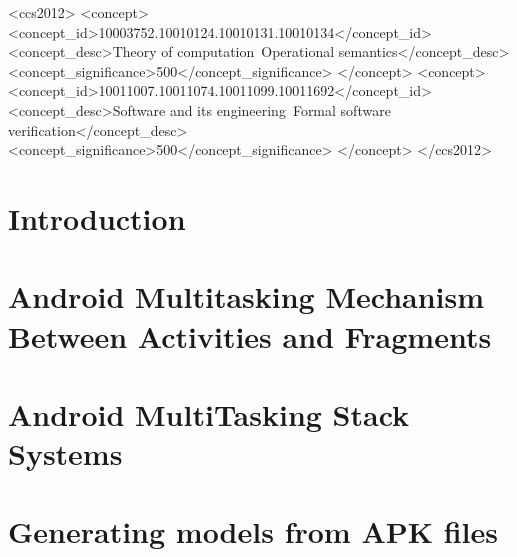 \documentclass[acmsmall,manuscript,screen,review]{acmart}
\begin{document}
\begin{CCSXML}
<ccs2012>
<concept>
<concept_id>10003752.10010124.10010131.10010134</concept_id>
<concept_desc>Theory of computation~Operational semantics</concept_desc>
<concept_significance>500</concept_significance>
</concept>
<concept>
<concept_id>10011007.10011074.10011099.10011692</concept_id>
<concept_desc>Software and its engineering~Formal software verification</concept_desc>
<concept_significance>500</concept_significance>
</concept>
</ccs2012>
\end{CCSXML}

 

 
\maketitle


\section{Introduction}\label{sec:introduction}

 

\section{Android Multitasking Mechanism Between Activities and Fragments} \label{sec:amm}


\section{Android MultiTasking Stack Systems} \label{sec:amass}


\section{Generating {\AMASS} models from APK files}\label{sec:apk2amass}

\end{document}
